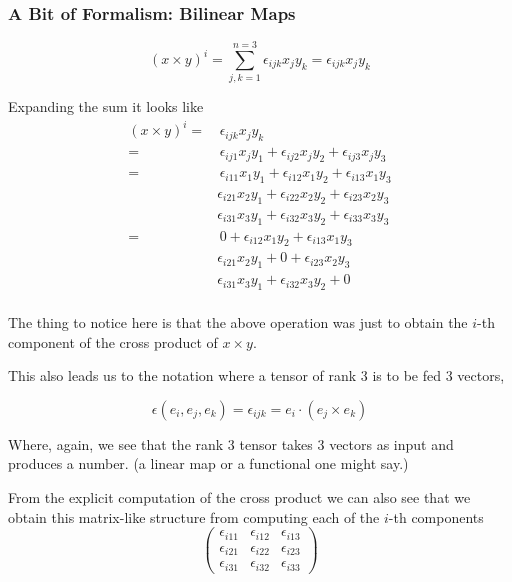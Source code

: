 \subsubsection{A Bit of Formalism: Bilinear Maps}

$$
\left( x \times y \right)^i = \sum_{j,k=1}^{n=3} \epsilon_{ijk} x_j y_k = \epsilon_{ijk} x_j y_k
$$

Expanding the sum it looks like
\begin{align*}
\left( x \times y \right)^i =& \, \epsilon_{ijk} x_j y_k \\
=& \, \epsilon_{ij1} x_j y_1 + \epsilon_{ij2} x_j y_2 + \epsilon_{ij3} x_j y_3 \\
=& \, \epsilon_{i11} x_1 y_1 + \epsilon_{i12} x_1 y_2 + \epsilon_{i13} x_1 y_3 \\
    & \epsilon_{i21} x_2 y_1 + \epsilon_{i22} x_2 y_2 + \epsilon_{i23} x_2 y_3 \\
    & \epsilon_{i31} x_3 y_1 + \epsilon_{i32} x_3 y_2 + \epsilon_{i33} x_3 y_3 \\
=& \, 0 + \epsilon_{i12} x_1 y_2 + \epsilon_{i13} x_1 y_3 \\
    & \epsilon_{i21} x_2 y_1 + 0 + \epsilon_{i23} x_2 y_3 \\
    & \epsilon_{i31} x_3 y_1 + \epsilon_{i32} x_3 y_2 + 0 \\
\end{align*}

The thing to notice here is that the above operation was just to obtain the $i$-th component of the cross product
of $x \times y$.

This also leads us to the notation where a tensor of rank 3 is to be fed 3 vectors,

$$
\epsilon (e_i, e_j, e_k) = \epsilon_{ijk} = e_i \cdot (e_j \times e_k)
$$

Where, again, we see that the rank 3 tensor takes 3 vectors as input and produces a number.
(a linear map or a functional one might say.)

From the explicit computation of the cross product we can also see that we obtain this matrix-like
structure from computing each of the $i$-th components
$$
\begin{pmatrix}
\epsilon_{i11} & \epsilon_{i12} & \epsilon_{i13} \\
\epsilon_{i21} & \epsilon_{i22} & \epsilon_{i23} \\
\epsilon_{i31} & \epsilon_{i32} & \epsilon_{i33}
\end{pmatrix}
$$

